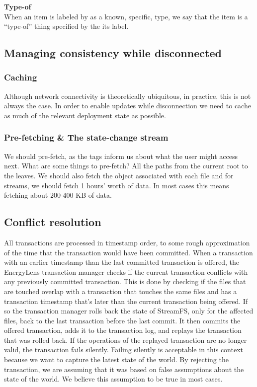 {\bf Type-of}\\
When an item is labeled by as a known, specific, type, we say that the item is a “type-of” thing specified by the its label.

\subsection{Managing consistency while disconnected}

\subsubsection{Caching}
Although network connectivity is theoretically ubiquitous, in practice, this is not always the case.  In order to enable updates while disconnection we need to cache as much of the relevant deployment state as possible.

\subsubsection{Pre-fetching \& The state-change stream}
We should pre-fetch, as the tags inform us about what the user might access next.  What are some things to pre-fetch?  All the paths from the current root to the leaves.  We should also fetch the object associated with each file and for streams, we should fetch 1 hours’ worth of data.  In most cases this means fetching about 200-400 KB of data.

\subsection{Conflict resolution}
All transactions are processed in timestamp order, to some rough approximation of the time that the transaction would have been committed.  When a transaction with an earlier timestamp than the last committed transaction is offered, the EnergyLens transaction manager checks if the current transaction conflicts with any previously committed transaction.  This is done by checking if the files that are touched overlap with a transaction that touches the same files and has a transaction timestamp that’s later than the current transaction being offered.  If so the transaction manager rolls back the state of StreamFS, only for the affected files, back to the last transaction before the last commit.  It then commits the offered transaction, adds it to the transaction log, and replays the transaction that was rolled back.  If the operations of the replayed transaction are no longer valid, the transaction fails silently.  Failing silently is acceptable in this context because we want to capture the latest state of the world.  By rejecting the transaction, we are assuming that it was based on false assumptions about the state of the world.  We believe this assumption to be true in most cases.


